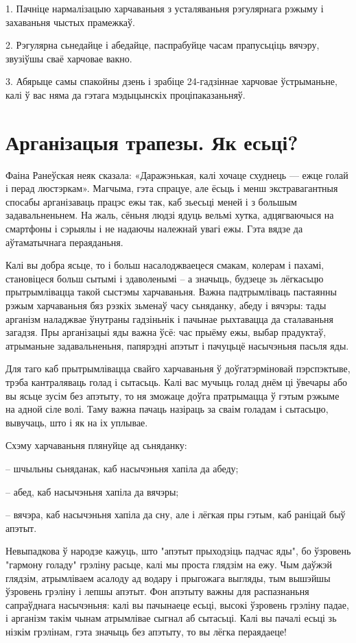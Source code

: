 1. Пачніце нармалізацыю харчаваньня з усталяваньня рэгулярнага рэжыму і захаваньня чыстых прамежкаў.

2. Рэгулярна сьнедайце і абедайце, паспрабуйце часам прапусьціць вячэру, звузіўшы сваё харчовае вакно.

3. Абярыце самы спакойны дзень і зрабіце 24-гадзіннае харчовае ўстрыманьне, калі ў вас няма да гэтага мэдыцынскіх проціпаказаньняў.


\section{Арганізацыя трапезы. Як есьці?}

Фаіна Ранеўская неяк сказала: «Даражэнькая, калі хочаце схуднець — ежце голай і перад люстэркам». Магчыма, гэта спрацуе, але ёсьць і менш экстравагантныя спосабы арганізаваць працэс ежы так, каб зьесьці меней і з большым задавальненьнем. На жаль, сёньня людзі ядуць вельмі хутка, адцягваючыся на смартфоны і сэрыялы і не надаючы належнай увагі ежы. Гэта вядзе да аўтаматычнага пераяданьня.

Калі вы добра ясьце, то і больш насалоджваецеся смакам, колерам і пахамі, становіцеся больш сытымі і здаволенымі – а значыць, будзеце зь лёгкасьцю прытрымлівацца такой сыстэмы харчаваньня. Важна падтрымліваць пастаянны рэжым харчаваньня бяз рэзкіх зьменаў часу сьняданку, абеду і вячэры: тады арганізм наладжвае ўнутраны гадзіньнік і пачынае рыхтавацца да сталаваньня загадзя. Пры арганізацыі яды важна ўсё: час прыёму ежы, выбар прадуктаў, атрыманьне задавальненьня, папярэдні апэтыт і пачуцьцё насычэньня пасьля яды.

Для таго каб прытрымлівацца свайго харчаваньня ў доўгатэрміновай пэрспэктыве, трэба кантраляваць голад і сытасьць. Калі вас мучыць голад днём ці ўвечары або вы ясьце зусім без апэтыту, то ня зможаце доўга пратрымацца ў гэтым рэжыме на адной сіле волі. Таму важна пачаць назіраць за сваім голадам і сытасьцю, вывучаць, што і як на іх уплывае.

Схэму харчаваньня плянуйце ад сьняданку: 

– шчыльны сьняданак, каб насычэньня хапіла да абеду;

– абед, каб насычэньня хапіла да вячэры;

– вячэра, каб насычэньня хапіла да сну, але і лёгкая пры гэтым, каб раніцай быў апэтыт.

Невыпадкова ў народзе кажуць, што "апэтыт прыходзіць падчас яды", бо ўзровень "гармону голаду" грэліну расьце, калі мы проста глядзім на ежу. Чым даўжэй глядзім, атрымліваем асалоду ад водару і прыгожага выгляды, тым вышэйшы ўзровень грэліну і лепшы апэтыт. Фон апэтыту важны для распазнаньня сапраўднага насычэньня: калі вы пачынаеце есьці, высокі ўзровень грэліну падае, і арганізм такім чынам атрымлівае сыгнал аб сытасьці. Калі вы пачалі есьці зь нізкім грэлінам, гэта значыць без апэтыту, то вы лёгка пераядаеце!

